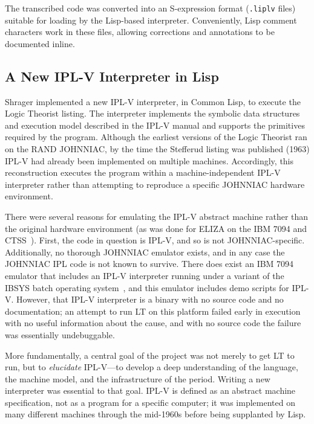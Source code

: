 \documentclass[journal]{IEEEtran}
\begin{document}
The transcribed code was converted into an S-expression format
(\texttt{.liplv} files) suitable for loading by the Lisp-based
interpreter. Conveniently, Lisp comment characters work in these
files, allowing corrections and annotations to be documented inline.

\subsection{A New IPL-V Interpreter in Lisp}
\label{sec:interpreter}

Shrager implemented a new IPL-V interpreter, in Common Lisp, to
execute the Logic Theorist listing. The interpreter implements the
symbolic data structures and execution model described in the IPL-V
manual and supports the primitives required by the program. Although
the earliest versions of the Logic Theorist ran on the RAND JOHNNIAC,
by the time the Stefferud listing was published (1963) IPL-V had
already been implemented on multiple machines. Accordingly, this
reconstruction executes the program within a machine-independent IPL-V
interpreter rather than attempting to reproduce a specific JOHNNIAC
hardware environment.

There were several reasons for emulating the IPL-V abstract machine
rather than the original hardware environment (as was done for ELIZA
on the IBM 7094 and CTSS~\cite{lane2025eliza}). First, the code in
question is IPL-V, and so is not JOHNNIAC-specific. Additionally, no
thorough JOHNNIAC emulator exists, and in any case the JOHNNIAC IPL
code is not known to survive. There does exist an IBM 7094 emulator
that includes an IPL-V interpreter running under a variant of the
IBSYS batch operating system~\cite{ibsys}, and this emulator includes
demo scripts for IPL-V. However, that IPL-V interpreter is a binary
with no source code and no documentation; an attempt to run LT on this
platform failed early in execution with no useful information about
the cause, and with no source code the failure was essentially
undebuggable.

More fundamentally, a central goal of the project was not merely to
get LT to run, but to \textit{elucidate} IPL-V---to develop a deep
understanding of the language, the machine model, and the
infrastructure of the period. Writing a new interpreter was essential
to that goal. IPL-V is defined as an abstract machine specification,
not as a program for a specific computer; it was implemented on many
different machines through the mid-1960s before being supplanted by
Lisp.
\end{document}
